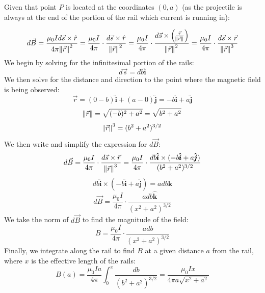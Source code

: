 \documentclass[12pt]{article}
\newcommand{\ih}{\pmb{\hat{i}}}
\newcommand{\jh}{\pmb{\hat{j}}}
\newcommand{\kh}{\pmb{\hat{k}}}
\begin{document}
Given that point $P$ is located at the coordinates $(0, a)$ (as the projectile is always at the end of the portion of the rail which current is running in): 

\begin{equation}
    d\vec{B} = \frac{\mu_0 I d\vec{s} \times \hat{r}}{4\pi \norm{\vec{r}}^2} = 
    \frac{\mu_0 I}{4\pi} \cdot \frac{d\vec{s} \times \hat{r}}{\norm{\vec{r}}^2} = 
    \frac{\mu_0 I}{4\pi} \cdot \frac{d\vec{s} \times \left(\frac{\vec{r}}{\norm{\vec{r}}}\right)}{\norm{\vec{r}}^2} = 
    \frac{\mu_0 I}{4\pi} \cdot \frac{d\vec{s} \times \vec{r}}{\norm{\vec{r}}^3}
\end{equation}
We begin by solving for the infinitesimal portion of the rails:
\begin{equation}
    d\vec{s} = db \ih
\end{equation} 
We then solve for the distance and direction to the point where the magnetic field is being observed:
\begin{equation}
    \vec{r} = (0 - b)\ih + (a - 0)\jh = -b\ih + a\jh
\end{equation}
\begin{equation}
    \norm{\vec{r}} = \sqrt{(-b)^2 + a^2} = \sqrt{b^2 + a^2}
\end{equation}
\begin{equation}
    \norm{\vec{r}}^3 = (b^2 + a^2)^{3/2}
\end{equation}
We then write and simplify the expression for $d\vec{B}$:
\begin{equation}
    d\vec{B} = \frac{\mu_0 I}{4\pi} \cdot \frac{d\vec{s} \times \vec{r}}{\norm{\vec{r}}^3} =
    \frac{\mu_0 I}{4\pi} \cdot \frac{db \ih \times (-b\ih + a\jh)}{(b^2 + a^2)^{3/2}}
\end{equation}
\begin{equation}
    db \ih \times (-b\ih + a\jh) = adb\kh
\end{equation}
\begin{equation}
    d\vec{B} = \frac{\mu_0 I}{4\pi} \cdot \frac{adb\kh}{(x^2 + a^2)^{3/2}}
\end{equation}
We take the norm of $d\vec{B}$ to find the magnitude of the field:
\begin{equation}
    B = \frac{\mu_0 I}{4\pi} \cdot \frac{adb}{(x^2 + a^2)^{3/2}}
\end{equation}
Finally, we integrate along the rail to find $B$ at a given distance $a$ from the rail, where $x$ is the effective length of the rails:
\begin{equation}
    B(a) = \frac{\mu_0 I a}{4\pi} \int_{0}^{x} \frac{db}{(b^2 + a^2)^{3/2}} =
    \frac{\mu_0 I x}{4\pi a \sqrt{x^2 + a^2}}
\end{equation}
\end{document}
